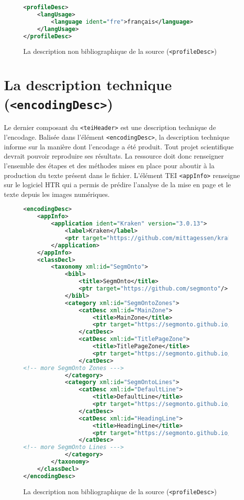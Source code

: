 \documentclass[class=article, crop=false]{standalone}
\begin{document}
\begin{figure}[htp]
\centering
\begin{lstlisting}[language=XML]
<profileDesc>
	<langUsage>
		<language ident="fre">français</language>
	</langUsage>
</profileDesc>
\end{lstlisting}
\caption{La description non bibliographique de la source (\texttt{<profileDesc>})}
\label{fig:profileDesc}
\end{figure}


\section{La description technique (\texttt{<encodingDesc>})}
Le dernier composant du \texttt{<teiHeader>} est une description technique de l'encodage. Balisée dans l'élément \texttt{<encodingDesc>}, la description technique informe sur la manière dont l'encodage a été produit. Tout projet scientifique devrait pouvoir reproduire ses résultats. La ressource doit donc renseigner l'ensemble des étapes et des méthodes mises en place pour aboutir à la production du texte présent dans le fichier. L'élément \acrshort{TEI} \texttt{<appInfo>} renseigne sur le logiciel \acrshort{HTR} qui a permis de prédire l'analyse de la mise en page et le texte depuis les images numériques.

\begin{figure}[htp]
\centering
\begin{lstlisting}[language=XML]
<encodingDesc>
	<appInfo>
		<application ident="Kraken" version="3.0.13">
			<label>Kraken</label>
			<ptr target="https://github.com/mittagessen/kraken"/>
		</application>
	</appInfo>
	<classDecl>
		<taxonomy xml:id="SegmOnto">
			<bibl>
				<title>SegmOnto</title>
				<ptr target="https://github.com/segmonto"/>
			</bibl>
			<category xml:id="SegmOntoZones">
				<catDesc xml:id="MainZone">
					<title>MainZone</title>
					<ptr target="https://segmonto.github.io/gd/gdZ/MainZone"/>
				</catDesc>
				<catDesc xml:id="TitlePageZone">
					<title>TitlePageZone</title>
					<ptr target="https://segmonto.github.io/gd/gdZ/TitlePageZone"/>
				</catDesc>
<!-- more SegmOnto Zones --->
			</category>
			<category xml:id="SegmOntoLines">
				<catDesc xml:id="DefaultLine">
					<title>DefaultLine</title>
					<ptr target="https://segmonto.github.io/gd/gdL/DefaultLine"/>
				</catDesc>
				<catDesc xml:id="HeadingLine">
					<title>HeadingLine</title>
					<ptr target="https://segmonto.github.io/gd/gdL/HeadingLine"/>
				</catDesc>
<!-- more SegmOnto Lines --->
			</category>
		</taxonomy>
	</classDecl>
</encodingDesc>
\end{lstlisting}
\caption{La description non bibliographique de la source (\texttt{<profileDesc>})}
\label{fig:profileDesc}
\end{figure}
\end{document}
